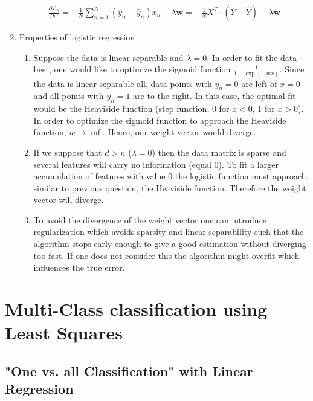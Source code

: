 \documentclass[12pt]{article}
\begin{document}
\begin{enumerate}
\begin{align*}
	\frac{\partial \mathcal{L}_\lambda}{\partial w} = -\frac{1}{N} \sum_{n=1}^{N} \left( y_n - \hat{y}_n \right) x_n + \lambda \textbf{w} = - \frac{1}{N} X^T \cdot \left( Y - \hat{Y} \right) + \lambda \textbf{w}
	\end{align*} 
	\item Properties of logistic regression
	\begin{enumerate}[label=(\alph*)]
		\item Suppose the data is linear separable and $\lambda=0$. In order to fit the data best, one would like to optimize the sigmoid function $\frac{1}{1+\exp(-wx)}$. Since the data is linear separable all, data points with $y_n=0$ are left of $x=0$ and all points with $y_n=1$ are to the right. In this case, the optimal fit would be the Heaviside function (step function, 0 for $x<0$, 1 for $x>0$). In order to optimize the sigmoid function to approach the Heaviside function, $w\rightarrow \inf$. Hence, our weight vector would diverge. 
		\item If we suppose that $d>n$ ($\lambda=0$) then the data matrix is sparse and several features will carry no information (equal 0). To fit a larger accumulation of features with value 0 the logistic function must approach, similar to previous question, the Heaviside function. Therefore the weight vector will diverge.
		\item To avoid the divergence of the weight vector one can introduce regularization which avoids sparsity and linear separability such that the algorithm stops early enough to give a good estimation without diverging too fast. If one does not consider this the algorithm might overfit which influences the true error.
	\end{enumerate}
						
\end{enumerate}

\newpage

\section{Multi-Class classification using Least Squares}

\subsection{"One vs. all Classification" with Linear Regression}
\end{document}
